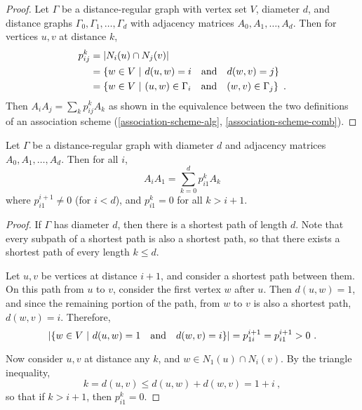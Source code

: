 \documentclass{report}
\begin{document}
    \begin{proof}
      Let $\Gamma$ be a distance-regular graph with vertex set $V$, diameter
      $d$, and distance graphs $\Gamma_0, \Gamma_1, \ldots, \Gamma_d$
      with adjacency matrices $A_0, A_1, \ldots, A_d$.
      Then for vertices $u, v$ at distance $k$,
      \begin{alignat*}{2}
        p_{ij}^k &= \left\lvert N_i(u) \cap N_j(v) \right\rvert \\
        &= \left\lbrace  w \in V \ \middle| \ d(u, w) = i \quad\text{and}\quad d(w, v) = j  \right\rbrace \\
        &= \left\lbrace  w \in V \ \middle| \ (u, w) \in \Gamma_i \quad\text{and}\quad (w, v) \in \Gamma_j  \right\rbrace
        \ .
      \end{alignat*}
      Then $A_i A_j = \sum_k p_{ij}^k A_k$ as shown in the equivalence between
      the two definitions of an association scheme
      (\ref{association-scheme-alg}, \ref{association-scheme-comb}).
    \end{proof}

    \begin{lem}\label{drg-mult-restricted}
      Let $\Gamma$ be a distance-regular graph with diameter $d$ and
      adjacency matrices $A_0, A_1, \ldots, A_d$.  Then for all $i$,
      $$
        A_i A_1 = \sum_{k=0}^d p_{i1}^k A_k
      $$
      where $p_{i1}^{i+1} \neq 0$ (for $i < d$),
      and $p_{i1}^k = 0$ for all $k > i + 1$.
    \end{lem}

    \begin{proof}
      If $\Gamma$ has diameter $d$, then there is a shortest path of length $d$.
      Note that every subpath of a shortest path is also a shortest path, so
      that there exists a shortest path of every length $k \leq d$.

      Let $u, v$ be vertices at distance $i+1$, and consider a shortest path
      between them.  On this path from $u$ to $v$, consider the first vertex $w$
      after $u$.  Then $d(u, w) = 1$, and since the remaining portion of the
      path, from $w$ to $v$ is also a shortest path, $d(w, v) = i$.  Therefore,
      $$
      \left\lvert \left\lbrace  w \in V \ \middle| \ d(u, w) = 1 \quad\text{and}\quad d(w, v) = i  \right\rbrace \right\rvert
      = p_{1i}^{i+1} = p_{i1}^{i+1} > 0 \ .
      $$

      Now consider $u, v$ at distance any $k$, and $w \in N_1(u) \cap N_i(v)$.
      By the triangle inequality,
      $$
        k = d(u, v) \leq d(u, w) + d(w, v)
        = 1 + i
        \ ,
      $$
      so that if $k > i + 1$, then $p_{i1}^k = 0$.
    \end{proof}
\end{document}
